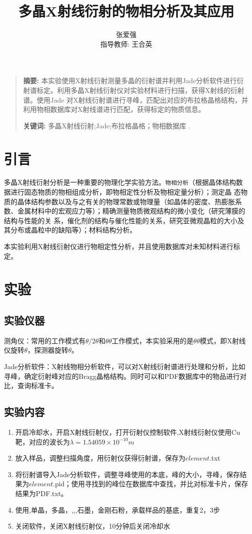 \documentclass[10pt]{ctexart}
\title{多晶X射线衍射的物相分析及其应用}
\author{张爱强\\指导教师: 王合英}
\date{}
\newenvironment{sciabstract}{%
\begin{quote} \textbf{摘要: }}
{\end{quote}}
\begin{document}
\maketitle
\begin{sciabstract}
    本实验使用X射线衍射测量多晶的衍射谱并利用Jade分析软件进行衍射谱标定。利用多晶X射线衍射仪对实验材料进行扫描，获得X射线的衍射谱。使用Jade
    对X射线衍射谱进行寻峰，匹配出对应的布拉格晶格结构，并利用物相数据库对X射线谱进行匹配，获得标定的物质信息。
    \par\textbf{关键词: } 多晶X射线衍射;Jade;布拉格晶格；物相数据库 .
\end{sciabstract}
\section{引言}
多晶X射线衍射分析是一种重要的物理化学实验方法。\texttt{物相分析}（根据晶体结构数据进行固态物质的物相组成分析，即物相定性分析及物相定量分析）；测定晶
态物质的晶体结构参数以及与之有关的物理常数或物理量（如晶体的密度、热膨胀系数、金属材料中的宏观应力等）；精确测量物质微观结构的微小变化（研究薄膜的结构与性能的关
系，催化剂的结构与催化性能的关系，研究亚微观晶粒的大小及其分布或晶粒中的缺陷等）；材料结构分析。

本实验利用X射线衍射仪进行物相定性分析，并且使用数据库对未知材料进行标定。
\section{实验}
\subsection{实验仪器}
测角仪：常用的工作模式有$\theta/2\theta$和$\theta\theta$工作模式，本实验采用的是$\theta\theta$模式，即X射线仪旋转$\theta$，探测器旋转$\theta$。

Jade分析软件：X射线物相分析软件，可以对X射线衍射谱进行处理和分析，比如寻峰，确定衍射峰对应的Bragg晶格结构。同时可以和PDF数据库中的物品进行对比，查询标准卡。
\subsection{实验内容}
\begin{enumerate}
    \item 开启冷却水，开启X射线衍射仪，打开衍射仪控制软件,X射线衍射仪使用Cu靶，对应的波长为$\lambda=1.54059\times 10^{-10}m$
    \item 放入样品，调整扫描角度，用衍射仪获得衍射谱，保存为$element$.txt
    \item 将衍射谱导入Jade分析软件，调整寻峰使用的本底，峰的大小，寻峰，保存结果为$element$.pid；使用寻找到的峰位在数据库中查找，并比对标准卡片，保存结果为PDF.txt。
    \item 使用,单晶，多晶，,,,石墨，金刚石粉，承载样品的基底，重复2，3步
    \item 关闭软件，关闭X射线衍射仪，10分钟后关闭冷却水
\end{enumerate}
\end{document}
